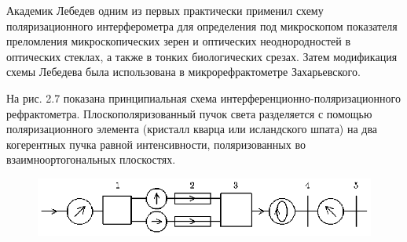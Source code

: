 Академик Лебедев одним из первых практически применил схему
поляризационного интерферометра для определения под микроскопом
показателя преломления микроскопических зерен и оптических
неоднородностей в оптических стеклах, а также в тонких
биологических срезах. Затем модификация схемы Лебедева была
использована в микрорефрактометре Захарьевского.

На рис. 2.7 показана принципиальная схема
интерференционно-поляризационного рефрактометра.
Плоскополяризованный пучок света разделяется с помощью
поляризационного элемента (кристалл кварца или исландского шпата)
на два когерентных пучка равной интенсивности, поляризованных во
взаимноортогональных плоскостях.

\begin{figure}[tbp]
\centerline{\hbox{\includegraphics[scale=1]{Ris/ris_eps/ris2_07.eps}}}


\end{figure}

